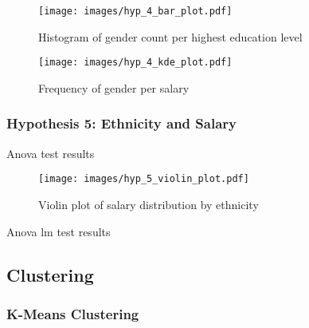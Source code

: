 \begin{figure}[H]
    \centering
    \texttt{[image: images/hyp\_4\_bar\_plot.pdf]} %
    \caption{Histogram of gender count per highest education level}
    \label{fig:histogram of gender by education level}
\end{figure}

\begin{figure}[H]
    \centering
    \texttt{[image: images/hyp\_4\_kde\_plot.pdf]} %
    \caption{Frequency of gender per salary}
    \label{fig:frequency of gender per salary}
\end{figure}

\subsubsection{Hypothesis 5: Ethnicity and Salary}

\begin{table}[H]
    \centering
    \caption{Anova test results}
    \label{tab:anova results}
    \begin{minipage}{\columnwidth}
        
    \end{minipage}
\end{table}

\begin{figure}[H]
    \centering
    \texttt{[image: images/hyp\_5\_violin\_plot.pdf]} %
    \caption{Violin plot of salary distribution by ethnicity}
    \label{fig:violin plot of salary distribution by ethnicity}
\end{figure}

\begin{table}[H]
    \centering
    \caption{Anova lm test results}
    \label{tab:anova lm results}
    \begin{minipage}{\columnwidth}
        
    \end{minipage}
\end{table}

\subsection{Clustering}

\subsubsection{K-Means Clustering}

